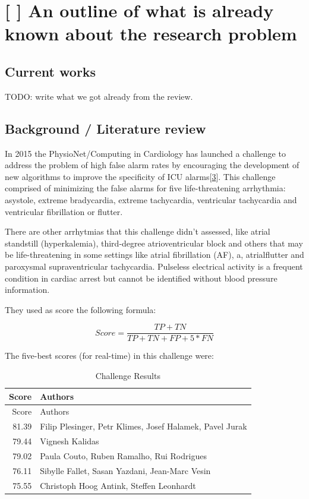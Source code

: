 \documentclass[runningheads]{llncs}
\begin{document}
\hypertarget{an-outline-of-what-is-already-known-about-the-research-problem}{%
\section{{[} {]} An outline of what is already known about the research
problem}\label{an-outline-of-what-is-already-known-about-the-research-problem}}

\hypertarget{current-works}{%
\subsection{Current works}\label{current-works}}

TODO: write what we got already from the review.

\hypertarget{background-literature-review}{%
\subsection{Background / Literature
review}\label{background-literature-review}}

In 2015 the PhysioNet/Computing in Cardiology has launched a challenge
to address the problem of high false alarm rates by encouraging the
development of new algorithms to improve the specificity of ICU
alarms{[}\protect\hyperlink{ref-Clifford2015}{3}{]}. This challenge
comprised of minimizing the false alarms for five life-threatening
arrhythmia: asystole, extreme bradycardia, extreme tachycardia,
ventricular tachycardia and ventricular fibrillation or flutter.

There are other arrhytmias that this challenge didn't assessed, like
atrial standstill (hyperkalemia), third-degree atrioventricular block
and others that may be life-threatening in some settings like atrial
fibrillation (AF), a, atrialflutter and paroxysmal supraventricular
tachycardia. Pulseless electrical activity is a frequent condition in
cardiac arrest but cannot be identified without blood pressure
information.

They used as score the following formula:

\[Score=\frac{TP+TN}{TP+TN+FP+5*FN}\]

The five-best scores (for real-time) in this challenge were:

\begin{longtable}[]{@{}rl@{}}
\caption{Challenge Results}\tabularnewline
\toprule
Score & Authors \\
\midrule
\endfirsthead
\toprule
Score & Authors \\
\midrule
\endhead
81.39 & Filip Plesinger, Petr Klimes, Josef Halamek, Pavel Jurak \\
79.44 & Vignesh Kalidas \\
79.02 & Paula Couto, Ruben Ramalho, Rui Rodrigues \\
76.11 & Sibylle Fallet, Sasan Yazdani, Jean-Marc Vesin \\
75.55 & Christoph Hoog Antink, Steffen Leonhardt \\
\bottomrule
\end{longtable}
\end{document}
